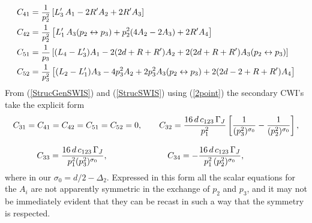 \documentclass[a4paper,11pt,openright,twoside]{book}
\newcommand{\sdfrac}[2]{\mbox{\small$\displaystyle\frac{#1}{#2}$}}
\numberwithin{equation}{section}
\begin{document}
{{{\begin{equation}
	\begin{split}
		C_{41}&=\sdfrac{1}{p_2^2}\left[L'_3\,A_1-2R'A_2+2R'A_3\right]\\
		C_{42}&=\sdfrac{1}{p_2^2}\left[L'_1\,A_3(p_2\leftrightarrow p_3)+p_2^2(4A_2-2A_3)+2R'A_4\right]\\
		C_{51}&=\sdfrac{1}{p_3}\left[(L_4-L'_3)A_1-2(2d+R+R')A_2+2(2d+R+R')A_3(p_2\leftrightarrow p_3)\right]\\
		C_{52}&=\sdfrac{1}{p_3^2}\left[(L_2-L'_1)A_3-4p_3^2A_2+2p_3^2A_3(p_2\leftrightarrow p_3)+2(2d-2+R+R')A_4\right]
	\end{split}
\end{equation}
From (\ref{StrucGenSWIS}) and (\ref{StrucSWIS}) using (\ref{2point}) the secondary CWI's take the explicit form 
\begin{equation}
	\begin{split}
		&C_{31}=C_{41}=C_{42}=C_{51}=C_{52}=0, \qquad C_{32}=\frac{16\,d\, c_{123}\,\Gamma_J}{p_1^2}\left[ \frac{1}{(p_3^2)^{\sigma_0}} - \frac{1}{(p_2^2)^{\sigma_0}} \right],\\[2ex]
		& \hspace{1cm}C_{33}=\frac{16\,d\,c_{123}\,\Gamma_J}{p_1^2 (p_3^2)^{\sigma_0}}, \hspace{2.5cm} C_{34}=-\frac{16\,d\,c_{123}\,\Gamma_J }{p_1^2\,(p_2^2)^{\sigma_0}},
	\end{split}
\end{equation}
where in our $\sigma_0=d/2-\Delta_2$. 
Expressed in this form all the scalar equations for the $A_i$ are not apparently symmetric in the exchange of $p_2$ and $p_3$, and it may not be immediately evident that they can be recast in such a way that the symmetry is respected. 

}}}
\end{document}
